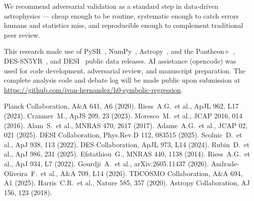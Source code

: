 \documentclass[twocolumn]{aastex631}
\begin{document}
We recommend adversarial validation as a standard step in data-driven
astrophysics --- cheap enough to be routine, systematic enough to catch
errors humans and statistics miss, and reproducible enough to
complement traditional peer review.

\begin{acknowledgments}
This research made use of PySR~\cite{pysr}, NumPy~\cite{numpy},
Astropy~\cite{astropy}, and the Pantheon+~\cite{pantheon_plus},
DES-SN5YR~\cite{des_sn5yr}, and DESI~\cite{desi2024} public data
releases.  AI assistance (opencode) was used for code development,
adversarial review, and manuscript preparation.
The complete analysis code and debate log will be made public upon
submission at \url{https://github.com/ivan-hernandez/h0-symbolic-regression}.
\end{acknowledgments}

\begin{thebibliography}{}
 Planck Collaboration, A$\&$A 641, A6 (2020).
 Riess~A.G.\ et al., ApJL 962, L17 (2024).
 Cranmer~M., ApJS 209, 23 (2023).
 Moresco~M.\ et al., JCAP 2016, 014 (2016).
 Alam~S.\ et al., MNRAS 470, 2617 (2017).
 Adame~A.G.\ et al., JCAP 02, 021 (2025).
 DESI Collaboration, Phys.Rev.D 112, 083515 (2025).
 Scolnic~D.\ et al., ApJ 938, 113 (2022).
 DES Collaboration, ApJL 973, L14 (2024).
 Rubin~D.\ et al., ApJ 986, 231 (2025).
 Efstathiou~G., MNRAS 440, 1138 (2014).
 Riess~A.G.\ et al., ApJ 934, L7 (2022).
 Gourdji~A.\ et al., arXiv:2605.11437 (2026).
 Andrade-Oliveira~F.\ et al., A\&A 709, L14 (2026).
 TDCOSMO Collaboration, A\&A 694, A1 (2025).
 Harris~C.R.\ et al., Nature 585, 357 (2020).
 Astropy Collaboration, AJ 156, 123 (2018).
\end{thebibliography}
\end{document}
